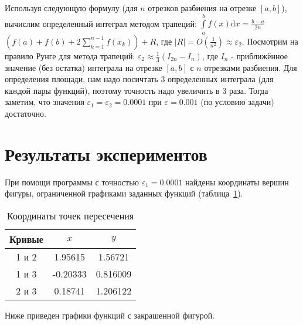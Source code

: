 \documentclass[a4paper,12pt,titlepage,finall]{article}
\begin{document}
Используя следующую формулу (для $n$ отрезков разбиения на отрезке $[a, b]$), вычислим определенный интеграл методом трапеций: $\int \limits_a^b f(x) \mathrm{d}x = \frac{b-a}{2n}$\\ $\left( f(a)+f(b)+ 2\sum \limits_{k=1}^{n-1}f(x_k) \right) + R$, где $|R| = O(\frac{1}{n^2}) \approx \varepsilon_2$. Посмотрим на правило Рунге для метода трапеций: $\varepsilon_2 \approx \frac{1}{3}(I_{2n} - I_n)$, где $I_n$ - приближённое значение (без остатка) интеграла на отрезке $[a,b]$ с $n$ отрезками разбиения. Для определения площади, нам надо посичтать 3 определенных интеграла (для каждой пары функций), поэтому точность надо увеличить в 3 раза. Тогда заметим, что значения $\varepsilon_1 = \varepsilon_2 = 0.0001$ при $\varepsilon = 0.001$ (по условию задачи) достаточно.

\newpage

\section{Результаты экспериментов}

При помощи программы с точностью $\varepsilon_1=0.0001$ найдены координаты вершин фигуры, ограниченной графиками заданных функций (таблица~\ref{table1}).

\begin{table}[h]
\centering
\begin{tabular}{|c|c|c|}
\hline
Кривые & $x$ & $y$ \\
\hline
1 и 2 & 1.95615 & 1.56721\\
1 и 3 &  -0.20333 & 0.816009 \\
2 и 3 & 0.18741 & 1.206122 \\
\hline
\end{tabular}
\caption{Координаты точек пересечения}
\label{table1}
\end{table}

Ниже приведен графики функций с закрашенной фигурой.
\end{document}
